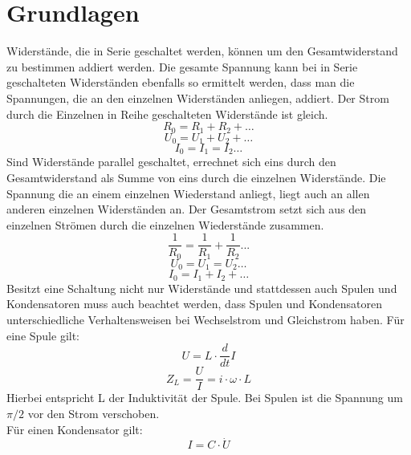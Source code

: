 \documentclass[12pt,a4paper,]{scrreprt}
\begin{document}
\section{Grundlagen}
Widerstände, die in Serie geschaltet werden, können um den Gesamtwiderstand zu bestimmen addiert werden. Die gesamte Spannung kann bei in Serie geschalteten  Widerständen ebenfalls so ermittelt werden, dass man die Spannungen, die an den einzelnen Widerständen anliegen, addiert. Der Strom durch die Einzelnen in Reihe geschalteten Widerstände ist gleich.\\
\begin{equation}
R_0= R_1 + R_2+…
\end{equation}
 \begin{equation}
 U_0 = U_1+U_2+…
 \end{equation}
 \begin{equation}
 I_0 = I_1 = I_2…
 \end{equation}
Sind Widerstände parallel geschaltet, errechnet sich eins durch den Gesamtwiderstand als Summe von eins durch die einzelnen Widerstände. Die Spannung die an einem einzelnen Wiederstand anliegt, liegt auch an allen anderen einzelnen Widerständen an. Der Gesamtstrom setzt sich aus den einzelnen Strömen durch die einzelnen Wiederstände zusammen.\\
\begin{equation}
\frac{1}{R_0} = \frac{1}{R_1} + \frac{1}{R_2} ...
\end{equation}
\begin{equation}
 U_0 = U_1 = U_2 …
\end{equation}
\begin{equation}
 I_0 = I_1 + I_2 + …
\end{equation}
Besitzt eine Schaltung nicht nur Widerstände und stattdessen auch Spulen und Kondensatoren muss auch beachtet werden, dass Spulen und Kondensatoren unterschiedliche Verhaltensweisen bei Wechselstrom und Gleichstrom haben. Für eine Spule gilt:\\
\begin{equation}
U=L\cdot \frac{d}{dt} I
\end{equation}
\begin{equation}
Z_L= \frac{U}{I} = i \cdot \omega \cdot L
\end{equation}
Hierbei entspricht L der Induktivität der Spule. Bei Spulen ist die Spannung um $\pi/2$ vor den Strom verschoben.\\
Für einen Kondensator gilt:\\
\begin{equation}
I = C\cdot\dot{U}
\end{equation}
\end{document}
